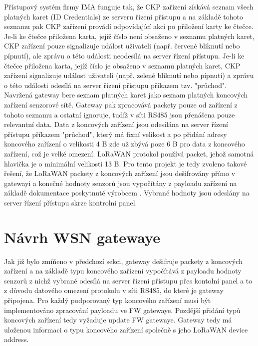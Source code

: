 Přístupový systém firmy IMA funguje tak, že CKP zařízení získává seznam všech platných karet (ID Credentials) ze serveru řízení přístupu a na základě tohoto seznamu pak CKP zařízení provádí odpovídající akci po přiložení karty ke čtečce. 
Je-li ke čtečce přiložena karta, jejíž číslo není obsaženo v seznamu platných karet, CKP zařízení pouze signalizuje událost uživateli (např. červené bliknutí nebo pípnutí), ale zprávu o této události neodesílá na server řízení přístupu. Je-li ke čtečce přiložena karta, jejíž číslo je obsaženo v seznamu platných karet, CKP zařízení signalizuje událost uživateli (např. zelené bliknutí nebo pípnutí) a zprávu o této události odesílá na server řízení přistupu příkazem tzv. "průchod".
Navržená gateway bere seznam platných karet jako seznam platných koncových zařízení senzorové sítě. Gateway pak zpracovává packety pouze od zařízení z tohoto seznamu a ostatní ignoruje, tudíž v síti RS485 jsou přenášena pouze relevantní data.
Data z koncových zařízení jsou odesílána na server řízení přístupu příkazem "průchod", který má fixní velikost a po přidání adresy koncového zařízení o velikosti 4 B zde už zbývá poze 6 B pro data z koncového zařízení, což je velké omezení.
LoRaWAN protokol používá packet, jehož samotná hlavička je o minimální velikosti 13 B. 
Pro tento projekt je tedy zvoleno takové řešení, že LoRaWAN packety z koncových zařízení jsou dešifrovány přímo v gatewayi a konečné hodnoty senzorů jsou vypočítány z payloadu zařízení na základě dokumentace poskytnuté výrobcem \cite{RHF1S001 pdf}. Vybrané hodnoty jsou odeslány na server řízení přístupu skrze kontrolní panel. 





\section{Návrh WSN gatewaye}
Jak již bylo zmíňeno v předchozí sekci, gateway dešifruje packety z koncových zařízení a na základě typu koncového zařízení vypočítává z payloadu hodnoty senzorů z nichž vybrané odesílá na server řízení přístupu přes kontolní panel a to z důvodu datového omezení protokolu v síti RS485, do které je gateway připojena.
Pro každý podporovaný typ koncového zařízení musí být implementováno zpracování payloadu ve FW gatewaye. Pozdější přidání typů koncových zařízení tedy vyžaduje update FW gatewaye.
Gateway tedy má uloženou informaci o typu koncového zařízení společně s jeho LoRaWAN device address.

